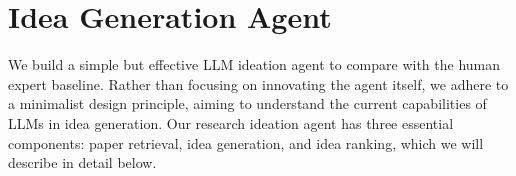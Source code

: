 \section{Idea Generation Agent}
\label{sec:agent}

We build a simple but effective LLM ideation agent to compare with the human expert baseline.
Rather than focusing on innovating the agent itself, we adhere to a minimalist design principle, aiming to understand the current capabilities of LLMs in idea generation. 
Our research ideation agent has three essential components: 
paper retrieval, idea generation, and idea ranking, which we will describe in detail below. 
%
%





